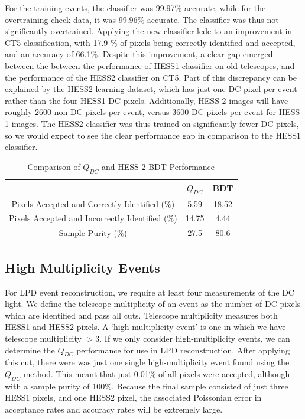 \documentclass[11pt]{article}
\begin{document}
For the training events, the classifier was 99.97\% accurate, while for the overtraining check data, it was 99.96\% accurate. The classifier was thus not significantly overtrained. Applying the new classifier lede to an improvement in CT5 classification, with 17.9 \% of pixels being correctly identified and accepted, and an accuracy of 66.1\%. Despite this improvement, a clear gap emerged between the between the performance of HESS1 classifier on old telescopes, and the performance of the HESS2 classifier on CT5. Part of this discrepancy can be explained by the HESS2 learning dataset, which has just one DC pixel per event rather than the four HESS1 DC pixels. Additionally, HESS 2 images will have roughly 2600 non-DC pixels per event, versus 3600 DC pixels per event for HESS 1 images. The HESS2 classifier was thus trained on significantly fewer DC pixels, so we would expect to see the clear performance gap in comparison to the HESS1 classifier.  

\begin{table}[h!]
  \centering
  \caption{Comparison of $Q_{DC}$ and HESS 2 BDT Performance}
  \label{tab:qdcbdtcomparison2}
  \begin{tabular}{ccc}
    \toprule
    & $Q_{DC}$ & BDT\\
    \midrule
    Pixels Accepted and Correctly Identified (\%) & 5.59 & 18.52 \\
   Pixels Accepted and Incorrectly Identified (\%) & 14.75 & 4.44 \\
    Sample Purity (\%) & 27.5 & 80.6 \\
    \bottomrule
  \end{tabular}
\end{table}

\subsection{High Multiplicity Events}
For LPD event reconstruction, we require at least four measurements of the DC light. We define the telescope multiplicity of an event as the number of DC pixels which are identified and pass all cuts. Telescope multiplicity measures both HESS1 and HESS2 pixels. A \textquoteleft high-multiplicity event' is one in which we have telescope multiplicity $>3$. If we only consider high-multiplicity events, we can determine the $Q_{DC}$ performance for use in LPD reconstruction. After applying this cut, there were was just one single high-multiplicity event found using the $Q_{DC}$ method. This meant that just 0.01\% of all pixels were accepted, although with a sample purity of 100\%. Because the final sample consisted of just three HESS1 pixels, and one HESS2 pixel, the associated Poissonian error in acceptance rates and accuracy rates will be extremely large.
\end{document}
